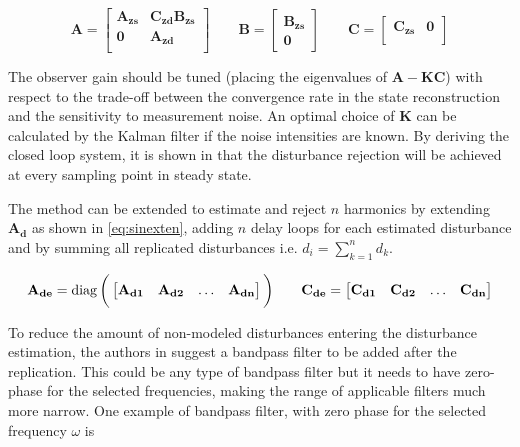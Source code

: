 \begin{equation}
  \label{eq:augumented}
  \mathbf{A} =
    \begin{bmatrix}
       \mathbf{A_{zs}} & \mathbf{C_{zd}B_{zs}}\\[0.3em]
       \mathbf{0} & \mathbf{A_{zd}}\\
     \end{bmatrix}
     \qquad
  \mathbf{B} =
    \begin{bmatrix}
        \mathbf{B_{zs}}\\
        \mathbf{0}
    \end{bmatrix}
     \qquad
  \mathbf{C} =
    \begin{bmatrix}
        \mathbf{C_{zs}} & \mathbf{0}\\
    \end{bmatrix}
\end{equation}

The observer gain should be tuned (placing the eigenvalues of $\mathbf{A-KC}$) with respect to the trade-off between the convergence rate in the state reconstruction and the sensitivity to measurement noise. An optimal choice of  $\mathbf{K}$ can be calculated by the Kalman filter if the noise intensities are known. By deriving the closed loop system, it is shown in \citep{fujimoto2004repetitive} that the disturbance rejection will be achieved at every sampling point in steady state.

The method can be extended to estimate and reject $n$ harmonics by extending $\mathbf{A_d}$ as shown in \eqref{eq:sinexten}, adding $n$ delay loops for each estimated disturbance and by summing all replicated disturbances i.e. $d_i = \sum_{k=1}^{n} d_k$.

\begin{equation}
  \label{eq:sinexten}
  \mathbf{A_{de}} =
    \operatorname{diag}\bigg(\begin{bmatrix}
      \mathbf{A_{d1}}  &  \mathbf{A_{d2}} & \hdots & \mathbf{A_{dn}} \\
     \end{bmatrix}\bigg)
     \qquad
  \mathbf{C_{de}} =
    \begin{bmatrix}
       \mathbf{C_{d1}}  &  \mathbf{C_{d2}} & \hdots & \mathbf{C_{dn}} \\
    \end{bmatrix}
\end{equation}

To reduce the amount of non-modeled disturbances entering the disturbance estimation, the authors in \citep{fujimoto2004repetitive} suggest a bandpass filter to be added after the replication. This could be any type of bandpass filter but it needs to have zero-phase for the selected frequencies, making the range of applicable filters much more narrow. One example of bandpass filter, with zero phase for the selected frequency $\omega$ is

